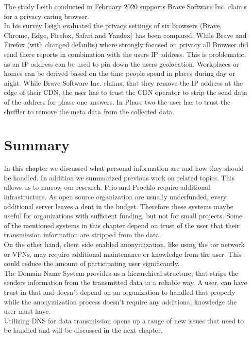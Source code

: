         The study Leith conducted in February 2020 \cite{leith_web_2020} supports Brave Software Inc. claims
        for a privacy caring browser.\\
        In his survey Leigh evaluated the privacy settings of six browsers (Brave, Chrome, Edge, Firefox, Safari and Yandex) has been compared. While Brave and Firefox (with changed defaults) where strongly focused on privacy all Browser did send there reports in combination with the users IP address\cite{leith_web_2020}.
        This is problematic, as an IP address can be used to pin down the users geolocation\cite{koch_geolocation_2013}. Workplaces or homes can be derived based on the time people spend in places during day or night. 
        While Brave Software Inc. claims, that they remove the IP address at the edge of their CDN, the user has to trust the CDN operator to strip the send data of the address for phase one answers. In Phase two the user has to trust the shuffler to remove the meta data from the collected data. 
\newpage
\section{Summary}
    In this chapter we discussed what personal information are and how they should be handled.
    In addition we summarized previous work on related topics. This allows us to narrow our research.
    Prio and Prochlo require additional infrastructure. As open source organization are usually underfunded, every additional server leaves a dent in the budget. Therefore these systems maybe
    useful for organizations with sufficient funding, but not for small projects. Some of the mentioned systems in this chapter depend on trust of the user that their transmission information are stripped from the data.\\
    
    On the other hand, client side enabled anonymization, like using the tor network or VPNs, may require additional maintenance or knowledge from the user. This could reduce the amount of participating user significantly.\\
    
    The Domain Name System provides us a hierarchical structure, that strips the senders information from the transmitted data in a reliable way. A user, can have trust in that and doesn't depend on an organization to handled that properly while the anonymization process doesn't require any additional knowledge the user must have.\\
    Utilizing DNS for data transmission opens up a range of new issues that need to be handled and will be discussed in the next chapter.\\ 
    
    
%


  